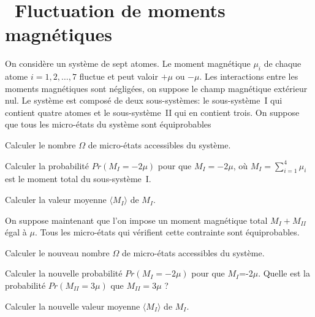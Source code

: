 \documentclass[utf8, 11pt]{feuille}
\begin{document}




\section{\soft~Fluctuation de moments magnétiques}

On considère un système de sept atomes. Le moment magnétique $\mu_i$ de chaque atome $i=1,2,\dots, 7$ fluctue et peut valoir $+\mu$ ou $-\mu$. Les interactions entre les moments magnétiques sont négligées, on suppose le champ magnétique extérieur nul. Le système est composé de deux sous-systèmes: le sous-système~I qui contient quatre atomes et le sous-système~II qui en contient trois. On suppose que tous les micro-états du système sont équiprobables

\question
Calculer le nombre $\varOmega$ de micro-états accessibles du système.
  
\question
Calculer la probabilité $Pr(M_I=-2\mu)$ pour que $M_I=-2\mu$, où $\displaystyle M_I=\sum_{i=1}^4 \mu_i$ est le moment total du sous-système~I. 

\question
Calculer la valeur moyenne $\langle M_I \rangle$ de $M_I$. 

\medskip

On suppose maintenant que l'on impose un moment magnétique total
$M_I+M_{II}$ égal à $\mu$. Tous les micro-états qui vérifient cette
contrainte sont équiprobables.

\question
Calculer le nouveau nombre $\varOmega$ de micro-états accessibles du système. 

\question
Calculer la nouvelle probabilité $Pr(M_I=-2\mu)$  pour que $M_I$=-2$\mu$. Quelle est la probabilité $Pr(M_{II}=3\mu)$ que $M_{II}=3\mu$ ? 

\question
Calculer la nouvelle valeur moyenne $\langle M_I \rangle$ de $M_I$. 
\end{document}
